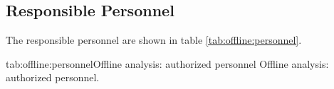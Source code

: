 {{} %

\infolevfour {


%
} %

\begin{safetyen}{10}{15}
\subsection{Responsible  Personnel} 
\end{safetyen}
The responsible personnel are shown in table \ref{tab:offline:personnel}.
\begin{namestab}{tab:offline:personnel}{Offline analysis: 
authorized personnel}{%
      Offline analysis: authorized personnel.}
  \RobertMichaels{}
  \AlexandreCamsonne{}
\end{namestab}
} 
